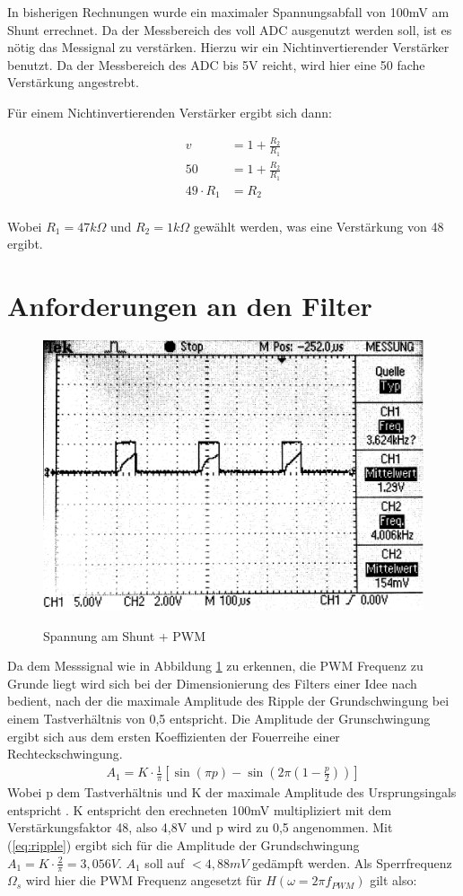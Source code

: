 \documentclass[11pt,twoside,a4paper,openright]{mpreport}
\begin{document}
In bisherigen Rechnungen wurde ein maximaler Spannungsabfall von 100mV am Shunt errechnet. Da der Messbereich des voll ADC ausgenutzt werden soll,
ist es nötig das Messignal zu verstärken. Hierzu wir ein Nichtinvertierender Verstärker benutzt. Da der Messbereich des ADC bis 5V reicht, wird hier eine 
50 fache Verstärkung angestrebt.

Für einem Nichtinvertierenden Verstärker ergibt sich dann:

\begin{align*}
v &= 1 + \frac{R_2}{R_1}\\
50 &= 1 + \frac{R_2}{R_1}\\
49\cdot R_1 &= R_2
\end{align*}
\\
Wobei $R_1 = 47 k\Omega$ und $R_2 = 1 k\Omega$  gewählt werden, was eine Verstärkung von 48 ergibt.



\section{Anforderungen an den Filter}

\begin{figure}[H]
\centering
\includegraphics[width=.8\textwidth]{oszi.png}\\
\caption{Spannung am Shunt + PWM}%
\label{fig:pwm+i}
\end{figure}

Da dem Messsignal wie in Abbildung \ref{fig:pwm+i} zu erkennen, die PWM Frequenz zu Grunde liegt wird sich bei der Dimensionierung des Filters einer Idee nach \cite{Alter2008} bedient, nach der die maximale Amplitude des Ripple der Grundschwingung bei einem
Tastverhältnis von 0,5 entspricht. Die Amplitude der Grunschwingung ergibt sich aus dem ersten Koeffizienten der Fouerreihe einer Rechteckschwingung.
\begin{align}
A_1 = K\cdot \frac{1}{\pi}[\sin(\pi p)-\sin(2\pi(1-\frac{p}{2}))]
\label{eq:ripple}
\end{align}
Wobei p dem Tastverhältnis und K der maximale Amplitude des Ursprungsingals entspricht \cite{Alter2008}. K entspricht den erechneten 100mV multipliziert mit dem Verstärkungsfaktor 48, also 4,8V und p wird zu 0,5
angenommen. Mit (\ref{eq:ripple}) ergibt sich für die Amplitude der Grundschwingung $ A_1 = K\cdot \frac{2}{\pi} = 3,056V$. $A_1$ soll auf $ < 4,88mV$ gedämpft werden.
Als Sperrfrequenz $\Omega_s $ wird hier die PWM Frequenz angesetzt für $H(\omega=2\pi f_{PWM})$ gilt also:
\end{document}
